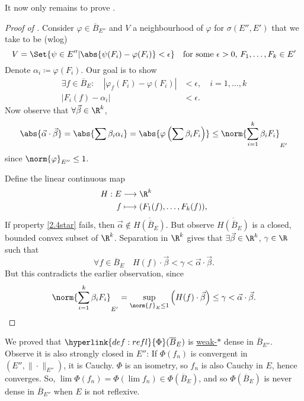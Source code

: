 \documentclass[twoside]{article}
\begin{document}
It now only remains to prove .
\begin{proof}[Proof of ]
    Consider $\varphi \in \overline{B}_{E''}$ and $V$ a neighbourhood of $\varphi$ for $\sigma(E'', E')$ that we take to be (wlog)
    \begin{equation*}
        V = \Set{\psi \in E'' | \abs{\psi(F_i) - \varphi(F_i)} < \epsilon} \quad \text{for some $\epsilon > 0$, $F_1, \dotsc, F_k \in E'$}
    \end{equation*}
    Denote $\alpha_i \coloneqq \varphi(F_i)$. Our goal is to show
    \begin{align*}
        \exists f \in \overline{B}_E: \quad |\varphi_f(F_i) - \varphi(F_i)| &< \epsilon, \quad i = 1, \dotsc, k \tag{$*$}\label{2.4star}\\
        |F_i(f) - \alpha_i| &< \epsilon.
    \end{align*}
    Now observe that $\forall \vec{\beta} \in \R^k$,
    \begin{equation*}
        \abs{\vec{\alpha} \cdot \vec{\beta}} = \abs{\sum \beta_i \alpha_i} = \abs{\varphi\left(\sum \beta_i F_i\right)} \leq \norm{\sum_{i=1}^k \beta_i F_i}_{E'}
    \end{equation*}
    since $\norm{\varphi}_{E''} \leq 1$.

    Define the linear continuous map
    \begin{align*}
        H : E &\longrightarrow \R^k \\
        f &\longmapsto (F_1(f), \dotsc, F_k(f)),
    \end{align*}
    If property \eqref{2.4star} fails, then $\vec{\alpha} \notin \overline{H(\overline{B}_E)}$.
    But observe $\overline{H(\overline{B}_E)}$ is a closed, bounded convex subset of $\R^k$.
    Separation in $\R^k$ gives that $\exists \vec{\beta} \in \R^k$, $\gamma \in \R$ such that
    \begin{equation*}
        \forall f \in \overline{B}_E \quad H(f) \cdot \vec{\beta} < \gamma < \vec{\alpha} \cdot \vec{\beta}.
    \end{equation*}
    But this contradicts the earlier observation, since
    \begin{equation*}
        \norm{\sum_{i=1}^k \beta_i F_i}_{E'} = \sup_{\norm{f}_E \leq 1} \left(H(f) \cdot \vec{\beta}\right) \leq \gamma < \vec{\alpha} \cdot \vec{\beta}. \qedhere
    \end{equation*}
\end{proof}

\begin{remark}
  We proved that $\hyperlink{def:refl}{\Phi}(\overline{B}_E)$ is \hyperlink{def:weakStar}{weak-$*$} dense in $\overline{B}_{E''}$.
  Observe it is also strongly closed in \hyperlink{def:doubleDual}{$E''$}: If $\Phi(f_n)$ is convergent in $(E'', \|\cdot\|_{E''})$, it is Cauchy.
  $\Phi$ is an isometry, so $f_n$ is also Cauchy in $E$, hence converges.
  So, $\lim \Phi(f_n) = \Phi(\lim f_n) \in \Phi(\overline{B}_E)$, and so $\Phi(\overline{B}_E)$ is never dense in $\overline{B}_{E''}$ when $E$ is not reflexive.
\end{remark}
\end{document}
